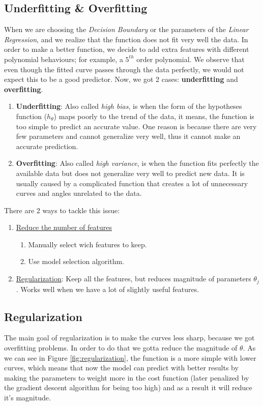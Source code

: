 \subsection{Underfitting \& Overfitting}
When we are choosing the \textit{Decision Boundary} or the parameters of the \textit{Linear Regression}, and we realize that the function does not fit very well the data. In order to make a better function, we decide to add extra features with different polynomial behaviours; for example, a $5^{th}$ order polynomial.
We observe that even though the fitted curve passes through the data perfectly, we would not expect this to be a good predictor. Now, we got 2 cases: \textbf{underfitting} and \textbf{overfitting}.

\begin{enumerate}[label=\arabic*.]
	\item \textbf{Underfitting}: Also called \textit{high bias}, is when the form of the hypotheses function ($h_{\theta}$) maps poorly to the trend of the data, it means, the function is too simple to predict an accurate value. One reason is because there are very few parameters and cannot generalize very well, thus it cannot make an accurate prediction.
	\item \textbf{Overfitting}: Also called \textit{high variance}, is when the function fits perfectly the available data but does not generalize very well to predict new data. It is usually caused by a complicated function that creates a lot of unnecessary curves and angles unrelated to the data.
\end{enumerate}

There are 2 ways to tackle this issue:
\begin{enumerate}[label=\arabic*.]
	\item \underline{Reduce the number of features}
	\begin{enumerate}[label=\textbullet]
		\item Manually select wich features to keep.
		\item Use model selection algorithm.
	\end{enumerate}
	\item \underline{Regularization}: Keep all the features, but reduces magnitude of parameters $\theta_j$. Works well when we have a lot of slightly useful features.

\end{enumerate}

\subsection{Regularization}
The main goal of regularization is to make the curves less sharp, because we got overfitting problems. In order to do that we gotta reduce the magnitude of $\theta$. As we can see in Figure \ref{fig:regularization}, the function is a more simple with lower curves, which means that now the model can predict with better results by making the parameters to weight more in the cost function (later penalized by the gradient descent algorithm for being too high) and as a result it will reduce it's magnitude.

